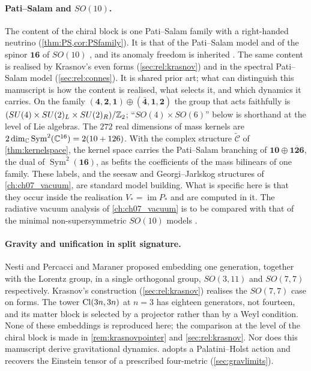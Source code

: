 \paragraph{Pati--Salam and $SO(10)$.} The content of the chiral block is one Pati--Salam family with a right-handed neutrino
(\cref{thm:PS,cor:PSfamily}). It is that of the Pati--Salam model \cite{PatiSalam} and of the spinor $\mathbf{16}$ of $SO(10)$
\cite{FritzschMinkowski}, and its anomaly freedom is inherited \cite{GeorgiGlashow72}. The same content is realised by Krasnov's even
forms (\cref{sec:rel:krasnov}) and in the spectral Pati--Salam model (\cref{sec:rel:connes}). It is shared prior art; what can distinguish
this manuscript is how the content is realised, what selects it, and which dynamics it carries. On the family
$(\mathbf4,\mathbf2,\mathbf1)\oplus(\bar{\mathbf4},\mathbf1,\mathbf2)$ the group that acts faithfully is
$(SU(4)\times SU(2)_L\times SU(2)_R)/\mathbb{Z}_2$; ``$SO(4)\times SO(6)$'' below is shorthand at the level of Lie algebras. The $272$ real dimensions
of mass kernels are $2\dim_{\mathbb{C}}\operatorname{Sym}^2(\mathbb{C}^{16})=2(10+126)$. With the complex structure $\widetilde{\mathcal C}$ of
\cref{thm:kernelspace}, the kernel space carries the Pati--Salam branching of $\mathbf{10}\oplus\overline{\mathbf{126}}$, the dual of
$\operatorname{Sym}^2(\mathbf{16})$, as befits the coefficients of the mass bilinears of one family. These labels, and the seesaw and
Georgi--Jarlskog structures of \cref{ch:ch07_vacuum}, are standard model building. What is specific here is that they occur inside the
realisation $V_*=\operatorname{im}P_*$ and are computed in it. The radiative vacuum analysis of \cref{ch:ch07_vacuum} is to be compared with
that of the minimal non-supersymmetric $SO(10)$ models \cite{BertoliniDiLuzioMalinsky10,BertoliniDiLuzioMalinsky12}.

\paragraph{Gravity and unification in split signature.} Nesti and Percacci \cite{NestiPercacci10} and Maraner \cite{Maraner04} proposed
embedding one generation, together with the Lorentz group, in a single orthogonal group, $SO(3,11)$ and $SO(7,7)$ respectively. Krasnov's
construction (\cref{sec:rel:krasnov}) realises the $SO(7,7)$ case on forms. The tower $\mathrm{Cl}(3n,3n)$ at $n=3$ has eighteen generators, not
fourteen, and its matter block is selected by a projector rather than by a Weyl condition. None of these embeddings is reproduced here; the
comparison at the level of the chiral block is made in \cref{rem:krasnovpointer} and \cref{sec:rel:krasnov}. Nor does this manuscript derive
gravitational dynamics.  adopts a Palatini--Holst action and recovers the Einstein tensor of a prescribed four-metric
(\cref{sec:gravlimits}).

